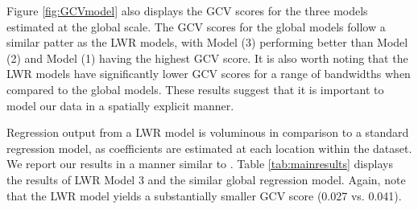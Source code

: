 \documentclass{article}\usepackage{graphicx, color}
\begin{document}
Figure \ref{fig:GCVmodel} also displays the GCV scores for the three models estimated at the global scale. The GCV scores for the global models follow a similar patter as the LWR models, with Model (3) performing better than Model (2) and Model (1) having the highest GCV score. It is also worth noting that the LWR models have significantly lower GCV scores for a range of bandwidths when compared to the global models. These results suggest that it is important to model our data in a spatially explicit manner.


Regression output from a LWR model is voluminous in comparison to a standard regression model, as coefficients are estimated at each location within the dataset. We report our results in a manner similar to \citet{MarmolejoDuarteCarlos;GonzalezTamez2009}. Table \ref{tab:mainresults} displays the results of LWR Model 3 and the similar global regression model. Again, note that the LWR model yields a substantially smaller GCV score (0.027 vs. 0.041).

\end{document}
